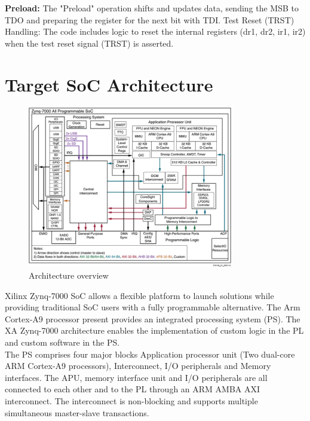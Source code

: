 \textbf{Preload:}
The "Preload" operation shifts and updates data, sending the MSB to TDO and preparing the register for the next bit with TDI.
Test Reset (TRST) Handling:
The code includes logic to reset the internal registers (dr1, dr2, ir1, ir2) when the test reset signal (TRST) is asserted.
\vspace{1mm}

\section{Target SoC Architecture}
\begin{figure}[h] %
  \centering
  \setlength{\abovecaptionskip}{0pt} %
  \setlength{\belowcaptionskip}{0pt} %
  \includegraphics[width=0.8\textwidth]{Image/soc7000.png} %
  \caption{Architecture overview}
  \label{Figure 1 : Architecture overview}
\end{figure}

Xilinx Zynq-7000 SoC allows a flexible platform to launch solutions while providing traditional SoC users with a fully programmable alternative. The Arm Cortex-A9 processor present provides an integrated processing system (PS). The XA Zynq-7000 architecture enables the implementation of custom logic in the PL and custom software in the PS. 
\vspace{2mm}
\\
The PS comprises four major blocks Application processor unit (Two dual-core ARM Cortex-A9 processors), Interconnect, I/O peripherals and Memory interfaces. The APU, memory interface unit and I/O peripherals are all connected to each other and to the PL through an ARM AMBA AXI interconnect. The interconnect is non-blocking and supports multiple simultaneous master-slave transactions.
\\

